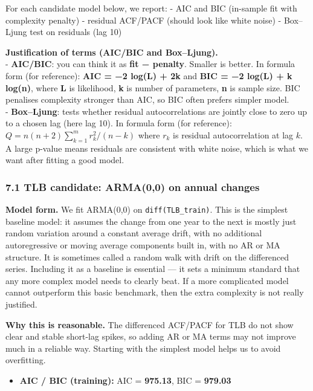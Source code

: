 \documentclass[
]{article}
\providecommand{\tightlist}{%
  \setlength{\itemsep}{0pt}\setlength{\parskip}{0pt}}
\begin{document}
For each candidate model below, we report: - AIC and BIC (in-sample fit
with complexity penalty) - residual ACF/PACF (should look like white
noise) - Box--Ljung test on residuals (lag 10)

\textbf{Justification of terms (AIC/BIC and Box--Ljung).}\\
- \textbf{AIC/BIC}: you can think it as \textbf{fit − penalty}. Smaller
is better. In formula form (for reference): \textbf{AIC = −2 log(L) +
2k} and \textbf{BIC = −2 log(L) + k log(n)}, where \textbf{L} is
likelihood, \textbf{k} is number of parameters, \textbf{n} is sample
size. BIC penalises complexity stronger than AIC, so BIC often prefers
simpler model.\\
- \textbf{Box--Ljung}: tests whether residual autocorrelations are
jointly close to zero up to a chosen lag (here lag 10). In formula form
(for reference): \(Q = n(n+2)\sum_{k=1}^{m} r_k^2/(n-k)\) where \(r_k\)
is residual autocorrelation at lag \(k\). A large p-value means
residuals are consistent with white noise, which is what we want after
fitting a good model.

\subsubsection{7.1 TLB candidate: ARMA(0,0) on annual
changes}\label{tlb-candidate-arma00-on-annual-changes}

\textbf{Model form.} We fit ARMA(0,0) on \texttt{diff(TLB\_train)}. This
is the simplest baseline model: it assumes the change from one year to
the next is mostly just random variation around a constant average
drift, with no additional autoregressive or moving average components
built in, with no AR or MA structure. It is sometimes called a random
walk with drift on the differenced series. Including it as a baseline is
essential --- it sets a minimum standard that any more complex model
needs to clearly beat. If a more complicated model cannot outperform
this basic benchmark, then the extra complexity is not really justified.

\textbf{Why this is reasonable.} The differenced ACF/PACF for TLB do not
show clear and stable short-lag spikes, so adding AR or MA terms may not
improve much in a reliable way. Starting with the simplest model helps
us to avoid overfitting.

\begin{itemize}
\tightlist
\item
  \textbf{AIC / BIC (training):} AIC = \textbf{975.13}, BIC =
  \textbf{979.03}
\end{itemize}
\end{document}
